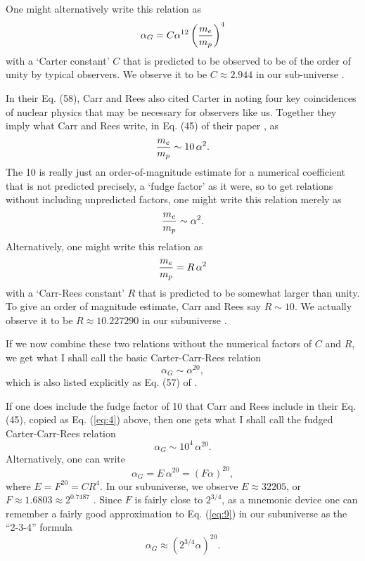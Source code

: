 \documentclass[a4paper,12pt]{article}
\begin{document}
 	One might alternatively write this relation as
 \begin{equation}
 \alpha_G = C\alpha^{12}\left({m_e\over m_p}\right)^4
 \label{eq:3}
 \end{equation}
with a `Carter constant' $C$ that is predicted to be
observed to be of the order of unity by typical observers.
We observe it to be $C \approx 2.944$ in our sub-universe \cite{PDG}.
 
	In their Eq. (58), Carr and Rees \cite{Carr-Rees}
also cited Carter \cite{Carter2} in noting
four key coincidences of nuclear physics that may be
necessary for observers like us.  Together they imply
what Carr and Rees write, in Eq. (45) of their paper \cite{Carr-Rees},
as
 \begin{equation}
 {m_e \over m_p} \sim 10 \, \alpha^2.
 \label{eq:4}
 \end{equation}
The 10 is really just an order-of-magnitude estimate
for a numerical coefficient that is not predicted precisely,
a `fudge factor' as it were, so to get relations
without including unpredicted factors, one might write this
relation merely as
 \begin{equation}
 {m_e \over m_p} \sim \alpha^2.
 \label{eq:5}
 \end{equation}
Alternatively, one might write this relation as
 \begin{equation}
 {m_e \over m_p} = R \, \alpha^2
 \label{eq:6}
 \end{equation}
with a `Carr-Rees constant' $R$ that is predicted
to be somewhat larger than unity.
To give an order of magnitude estimate, Carr and Rees say $R \sim 10$.
We actually observe it to be $R \approx 10.227290$ in our subuniverse
\cite{PDG}.

	If we now combine these two relations
without the numerical factors of $C$ and $R$, we get
what I shall call the basic Carter-Carr-Rees relation
 \begin{equation}
 \alpha_G \sim \alpha^{20},
 \label{eq:7}
 \end{equation}
which is also listed explicitly as Eq. (57) of \cite{Carr-Rees}.

	If one does include the fudge factor of 10
that Carr and Rees include in their Eq. (45),
copied as Eq. (\ref{eq:4}) above,
then one gets what I shall call the fudged
Carter-Carr-Rees relation
 \begin{equation}
 \alpha_G \sim 10^4\,\alpha^{20}.
 \label{eq:8}
 \end{equation}
Alternatively, one can write
 \begin{equation}
 \alpha_G = E \,\alpha^{20} = (F \alpha)^{20},
 \label{eq:9}
 \end{equation}
where $E = F^{20} = C R^4$.
In our subuniverse, we observe $E \approx 32205$,
or $F \approx 1.6803 \approx 2^{0.7487}$ \cite{PDG}.
Since $F$ is fairly close to $2^{3/4}$,
as a mnemonic device one can remember
a fairly good approximation to Eq. (\ref{eq:9})
in our subuniverse as the ``2-3-4'' formula
 \begin{equation}
 \alpha_G \approx (2^{3/4} \alpha)^{20}.
 \label{eq:9b}
 \end{equation}
\end{document}

